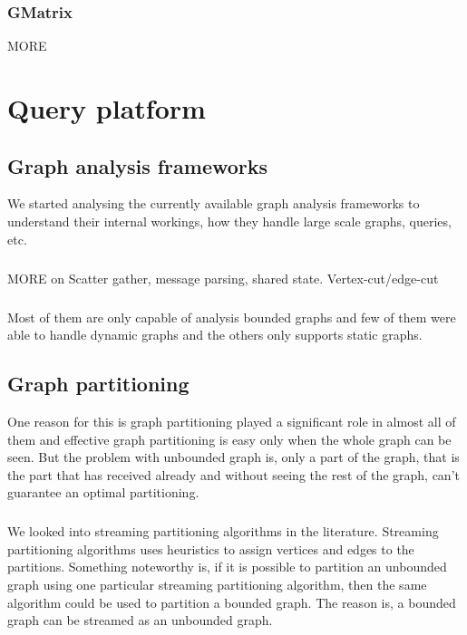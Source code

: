 \documentclass[12pt]{report}
\numberwithin{figure}{section}
\numberwithin{table}{section}
\begin{document}
\subsection{GMatrix}
\cite{GMatrix} MORE

\chapter{Query platform}


\section{Graph analysis frameworks}
We started analysing the currently available graph analysis frameworks to understand their internal workings, how they handle large scale graphs, queries, etc.

\paragraph{}

MORE on Scatter gather,  message parsing, shared state. Vertex-cut/edge-cut 

\paragraph{}

Most of them are only capable of analysis bounded graphs and few of them were able to handle dynamic graphs and the others only supports static graphs. 

\section{Graph partitioning}
One reason for this is graph partitioning played a significant role in almost all of them and effective graph partitioning is easy only when the whole graph can be seen. But the problem with unbounded graph is, only a part of the graph, that is the part that has received already and without seeing the rest of the graph, can’t guarantee an optimal partitioning.
 
\paragraph{}

We looked into streaming partitioning algorithms in the literature. Streaming partitioning algorithms uses heuristics\cite{Streaming Balanced Graph Partitioning Algorithms1} \cite{Streaming Balanced Graph Partitioning Algorithms2} to assign vertices and edges to the partitions. Something noteworthy is, if it is possible to partition an unbounded graph using one particular streaming partitioning algorithm, then the same algorithm could be used to partition a bounded graph. The reason is, a bounded graph can be streamed as an unbounded graph.
 
\end{document}
